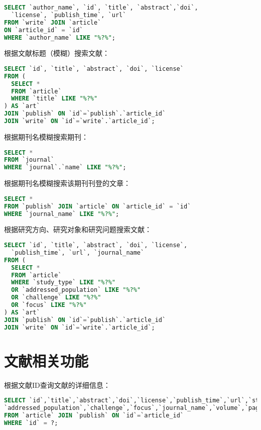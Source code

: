 \documentclass[UTF8,openany]{ctexbook}
\begin{document}
\begin{lstlisting}[language=sql]
SELECT `author_name`, `id`, `title`, `abstract`,`doi`,
  `license`, `publish_time`, `url` 
FROM `write` JOIN `article` 
ON `article_id` = `id` 
WHERE `author_name` LIKE "%?%";
\end{lstlisting}

根据文献标题（模糊）搜索文献：

\begin{lstlisting}[language=sql]
SELECT `id`, `title`, `abstract`, `doi`, `license`
FROM (
  SELECT * 
  FROM `article`
  WHERE `title` LIKE "%?%"
) AS `art`
JOIN `publish` ON `id`=`publish`.`article_id`
JOIN `write` ON `id`=`write`.`article_id`;
\end{lstlisting}

根据期刊名模糊搜索期刊：

\begin{lstlisting}[language=sql]
SELECT * 
FROM `journal` 
WHERE `journal`.`name` LIKE "%?%";
\end{lstlisting}

根据期刊名模糊搜索该期刊刊登的文章：
\begin{lstlisting}[language=sql]
SELECT * 
FROM `publish` JOIN `article` ON `article_id` = `id`
WHERE `journal_name` LIKE "%?%";
\end{lstlisting}

根据研究方向、研究对象和研究问题搜索文献：
\begin{lstlisting}[language=sql]
SELECT `id`, `title`, `abstract`, `doi`, `license`, 
  `publish_time`, `url`, `journal_name`
FROM (
  SELECT * 
  FROM `article`
  WHERE `study_type` LIKE "%?%"
  OR `addressed_population` LIKE "%?%"
  OR `challenge` LIKE "%?%"
  OR `focus` LIKE "%?%"
) AS `art`
JOIN `publish` ON `id`=`publish`.`article_id`
JOIN `write` ON `id`=`write`.`article_id`;
\end{lstlisting}



\section{文献相关功能}

根据文献ID查询文献的详细信息：

\begin{lstlisting}[language=sql]
SELECT `id`,`title`,`abstract`,`doi`,`license`,`publish_time`,`url`,`study_type`,
`addressed_population`,`challenge`,`focus`,`journal_name`,`volume`,`pages`
FROM `article` JOIN `publish` ON `id`=`article_id`
WHERE `id` = ?;
\end{lstlisting}
\end{document}
